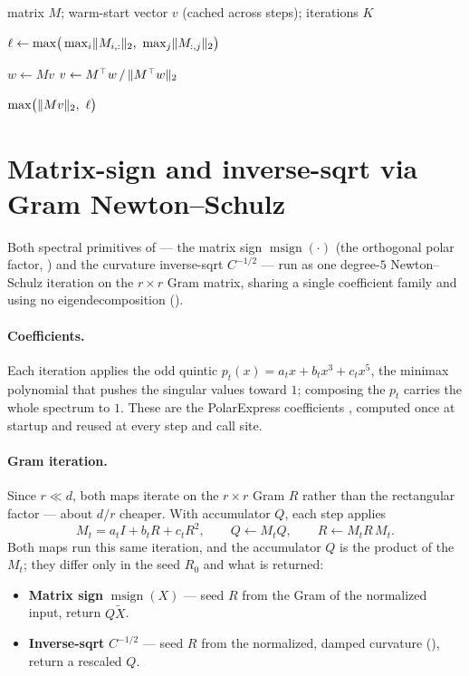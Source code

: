 \documentclass[11pt]{article}
\DeclarePairedDelimiter{\norm}{\lVert}{\rVert}
\DeclareMathOperator{\polar}{msign}          %
\theoremstyle{plain}
\theoremstyle{definition}
\theoremstyle{remark}
\begin{document}
\begin{algorithm}[h]
\caption{Guarded spectral-norm estimate of $\norm{M}_2$}
\label{alg:smax}
\begin{algorithmic}[1]
\Require matrix $M$; warm-start vector $v$ (cached across steps); iterations $K$
\Statex

\State $\ell\gets\max\!\big(\max_i\norm{M_{i,:}}_2,\ \max_j\norm{M_{:,j}}_2\big)$
\Statex

 
  \State $w\gets Mv$
  \State $v\gets M^\top w \,/\, \norm{M^\top w}_2$
\EndFor
\Statex

\State \Return $\max\!\big(\norm{Mv}_2,\ \ell\big)$ 
\end{algorithmic}
\end{algorithm}

\section{Matrix-sign and inverse-sqrt via Gram Newton--Schulz}
\label{app:gramns}
Both spectral primitives of  --- the matrix sign $\polar(\cdot)$ (the
orthogonal polar factor, ) and the curvature inverse-sqrt $C^{-1/2}$ ---
run as one degree-$5$ Newton--Schulz iteration on the $r\times r$ Gram matrix, sharing a
single coefficient family and using no eigendecomposition ().

\paragraph{Coefficients.} Each iteration applies the odd quintic
$p_t(x)=a_t x+b_t x^3+c_t x^5$, the minimax polynomial that pushes the singular values
toward $1$; composing the $p_t$ carries the whole spectrum to $1$. These are the
PolarExpress coefficients \cite{polarexpress}, computed once at startup and reused at
every step and call site.

\paragraph{Gram iteration.} Since $r\ll d$, both maps iterate on the $r\times r$ Gram
$R$ rather than the rectangular factor \cite{gram_ns} --- about $d/r$ cheaper. With
accumulator $Q$, each step applies
\begin{equation*}
  M_t=a_t I+b_t R+c_t R^2,\qquad Q\gets M_t Q,\qquad R\gets M_t R\,M_t .
\end{equation*}
Both maps run this same iteration, and the accumulator $Q$ is the product of the $M_t$;
they differ only in the seed $R_0$ and what is returned:
\begin{itemize}[leftmargin=1.5em,itemsep=1pt,topsep=2pt]
  \item \textbf{Matrix sign} $\polar(X)$ --- seed $R$ from the Gram of the normalized input, return $Q\tilde X$.
  \item \textbf{Inverse-sqrt} $C^{-1/2}$ --- seed $R$ from the normalized, damped curvature (), return a rescaled $Q$.
\end{itemize}
\end{document}
